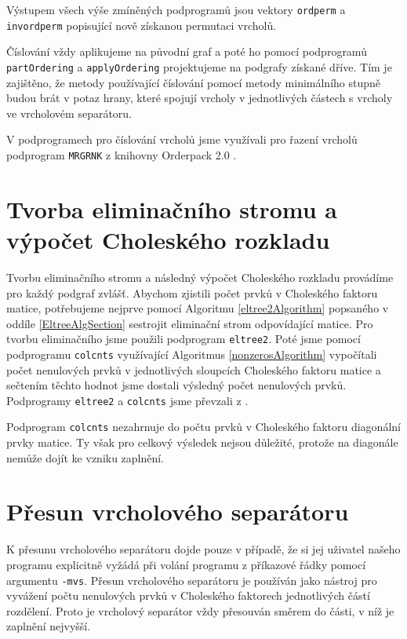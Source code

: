 \documentclass{ctuthesis}
\theoremstyle{plain}
\theoremstyle{definition}
\begin{document}
Výstupem všech výše zmíněných podprogramů jsou vektory \texttt{ordperm} a \texttt{invordperm} popisující nově získanou permutaci vrcholů.

Číslování vždy aplikujeme na původní graf a poté ho pomocí podprogramů \texttt{partOrdering} a \texttt{applyOrdering} projektujeme na podgrafy získané dříve. Tím je zajištěno, že metody používající číslování pomocí metody minimálního stupně budou brát v potaz hrany, které spojují vrcholy v jednotlivých částech s vrcholy ve vrcholovém separátoru.

V podprogramech pro číslování vrcholů jsme využívali pro řazení vrcholů podprogram \texttt{MRGRNK} z knihovny Orderpack 2.0 \cite{orderpack}.

\section{Tvorba eliminačního stromu a výpočet Choleského rozkladu}
Tvorbu eliminačního stromu a následný výpočet Choleského rozkladu provádíme pro každý podgraf zvlášť. Abychom zjistili počet prvků v Choleského faktoru matice, potřebujeme nejprve pomocí Algoritmu \ref{eltree2Algorithm} popsaného v oddíle \ref{EltreeAlgSection} sestrojit eliminační strom odpovídající matice. Pro tvorbu eliminačního jsme použili podprogram \texttt{eltree2}. Poté jsme pomocí podprogramu \texttt{colcnts}  využívající Algoritmus \ref{nonzerosAlgorithm} vypočítali počet nenulových prvků v jednotlivých sloupcích Choleského faktoru matice a sečtením těchto hodnot jsme dostali výsledný počet nenulových prvků. Podprogramy \texttt{eltree2} a \texttt{colcnts} jsme převzali z \cite{lapack}.

Podprogram \texttt{colcnts} nezahrnuje do počtu prvků v Choleského faktoru diagonální prvky matice. Ty však pro celkový výsledek nejsou důležité, protože na diagonále nemůže dojít ke vzniku zaplnění.

\section{Přesun vrcholového separátoru}
K přesunu vrcholového separátoru dojde pouze v případě, že si jej uživatel našeho programu explicitně vyžádá při volání programu z příkazové řádky pomocí argumentu \texttt{-mvs}. Přesun vrcholového separátoru je používán jako nástroj pro vyvážení počtu nenulových prvků v Choleského faktorech jednotlivých částí rozdělení. Proto je vrcholový separátor vždy přesouván směrem do části, v níž je zaplnění nejvyšší.
\end{document}
